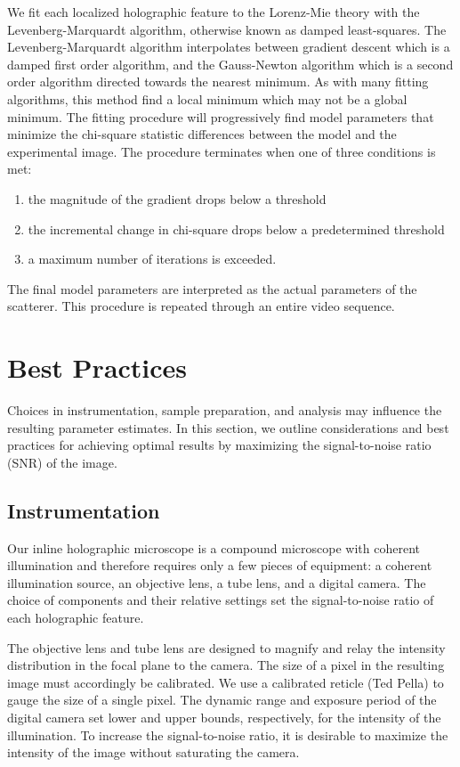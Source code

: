 We fit each localized holographic feature to the Lorenz-Mie theory
with the Levenberg-Marquardt algorithm, otherwise known as damped least-squares.
The Levenberg-Marquardt algorithm interpolates between gradient descent which is a damped
first order algorithm, and the Gauss-Newton algorithm which is a second order
algorithm directed towards the nearest minimum. As with many fitting algorithms,
this method find a local minimum which may not be a global minimum. The fitting
procedure will progressively find model parameters that minimize the
chi-square statistic differences between the model and the experimental image.
The procedure terminates when one of three conditions is met:
\begin{enumerate}
\item the magnitude of the gradient drops below a threshold
\item the incremental change in chi-square drops below a predetermined threshold
\item a maximum number of iterations is exceeded.
\end{enumerate}
The final model parameters are interpreted as the actual parameters of the
scatterer. This procedure is repeated through an entire video sequence.

\section{Best Practices}

Choices in instrumentation, sample preparation, and analysis may influence
the resulting parameter estimates. In this section, we outline considerations
and best practices for achieving optimal results by maximizing the
signal-to-noise ratio (SNR) of the image.

\subsection{Instrumentation}

Our inline holographic microscope is a compound microscope with
coherent illumination and therefore requires only a few pieces of equipment:
a coherent illumination source, an objective lens, a tube lens, and a digital
camera. The choice of components and their relative settings
set the signal-to-noise ratio of each holographic feature.

The objective lens and tube lens are designed to magnify and relay the
intensity distribution in the focal plane to the camera.
The size of a pixel in the resulting image
must accordingly be calibrated. We use a calibrated reticle (Ted Pella) to
gauge the size of a single pixel.%
The dynamic range and exposure period of the digital camera set lower and
upper bounds, respectively, for the intensity of the illumination.
To increase the signal-to-noise
ratio, it is desirable to maximize the intensity of the image without
saturating the camera. 

